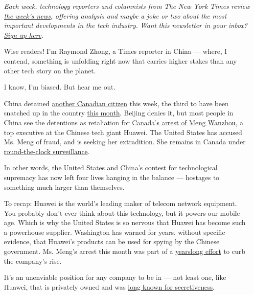 \emph{Each week, technology reporters and columnists from The New York
Times review}
\href{https://www.nytimes.com/section/technology?module=inline}{\emph{the
week's news}}\emph{, offering analysis and maybe a joke or two about the
most important developments in the tech industry. Want this newsletter
in your inbox?}
\href{https://www.nytimes.com/newsletters/bits?emc=edit_tu_20171005\&nl=bits\&nlid=646676\&te=1\&module=inline}{\emph{Sign
up here}}\emph{.}

Wise readers! I'm Raymond Zhong, a Times reporter in China --- where, I
contend, something is unfolding right now that carries higher stakes
than any other tech story on the planet.

I know, I'm biased. But hear me out.

China detained
\href{https://www.nytimes.com/2018/12/19/us/politics/china-canada-huawei.html}{another
Canadian citizen} this week, the third to have been snatched up in the
country
\href{https://www.nytimes.com/2018/12/14/world/canada/china-detained-spavor-kovrig.html}{this
month}. Beijing denies it, but most people in China see the detentions
as retaliation for
\href{https://www.nytimes.com/2018/12/05/business/huawei-cfo-arrest-canada-extradition.html}{Canada's
arrest of Meng Wanzhou}, a top executive at the Chinese tech giant
Huawei. The United States has accused Ms. Meng of fraud, and is seeking
her extradition. She remains in Canada under
\href{https://www.nytimes.com/2018/12/11/technology/huawei-executive-canada-bail-decision.html}{round-the-clock
surveillance}.

In other words, the United States and China's contest for technological
supremacy has now left four lives hanging in the balance --- hostages to
something much larger than themselves.

To recap: Huawei is the world's leading maker of telecom network
equipment. You probably don't ever think about this technology, but it
powers our mobile age. Which is why the United States is so nervous that
Huawei has become such a powerhouse supplier. Washington has warned for
years, without specific evidence, that Huawei's products can be used for
spying by the Chinese government. Ms. Meng's arrest this month was part
of a
\href{https://www.nytimes.com/2018/12/14/business/huawei-meng-hsbc-canada.html}{yearslong
effort} to curb the company's rise.

It's an unenviable position for any company to be in --- not least one,
like Huawei, that is privately owned and was
\href{https://www.nytimes.com/2018/12/07/technology/meng-wanzhou-huawei-arrest.html}{long
known for secretiveness}.

